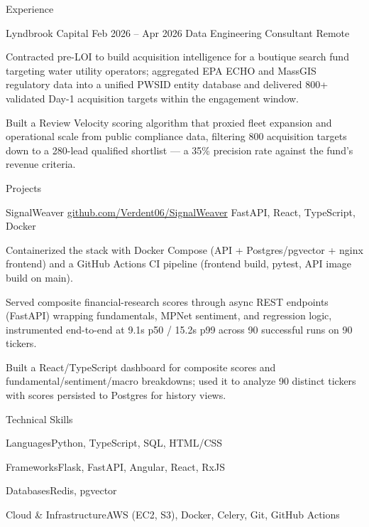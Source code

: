 \documentclass[
	11pt
]{../../../template}
\begin{document}
\begin{rSection}{E}{xperience}
		\begin{rSectionEntry}
			{Lyndbrook Capital}
			{Feb 2026 -- Apr 2026}
			{Data Engineering Consultant}
			{}
			{Remote}

			\item Contracted pre-LOI to build acquisition intelligence for a boutique search fund targeting water utility operators; aggregated EPA ECHO and MassGIS regulatory data into a unified PWSID entity database and delivered 800+ validated Day-1 acquisition targets within the engagement window.
			\item Built a Review Velocity scoring algorithm that proxied fleet expansion and operational scale from public compliance data, filtering 800 acquisition targets down to a 280-lead qualified shortlist --- a 35\% precision rate against the fund's revenue criteria.
		\end{rSectionEntry}
	\end{rSection}

	\begin{rSection}{P}{rojects}
		\begin{rSectionEntry}
			{SignalWeaver}
			{\href{https://github.com/Verdent06/SignalWeaver}{github.com/Verdent06/SignalWeaver}}
			{}
			{FastAPI, React, TypeScript, Docker}
			{}

			\item Containerized the stack with Docker Compose (API + Postgres/pgvector + nginx frontend) and a GitHub Actions CI pipeline (frontend build, pytest, API image build on main).
			\item Served composite financial-research scores through async REST endpoints (FastAPI) wrapping fundamentals, MPNet sentiment, and regression logic, instrumented end-to-end at 9.1s p50 / 15.2s p99 across 90 successful runs on 90 tickers.
			\item Built a React/TypeScript dashboard for composite scores and fundamental/sentiment/macro breakdowns; used it to analyze 90 distinct tickers with scores persisted to Postgres for history views.
		\end{rSectionEntry}
	\end{rSection}

	\begin{rSection}{T}{echnical Skills}
		\begin{rSet}{Languages}{Python, TypeScript, SQL, HTML/CSS}
		\end{rSet}
		\begin{rSet}{Frameworks}{Flask, FastAPI, Angular, React, RxJS}
		\end{rSet}
		\begin{rSet}{Databases}{Redis, pgvector}
		\end{rSet}
		\begin{rSet}{Cloud \& Infrastructure}{AWS (EC2, S3), Docker, Celery, Git, GitHub Actions}
		\end{rSet}
	\end{rSection}
\end{document}
